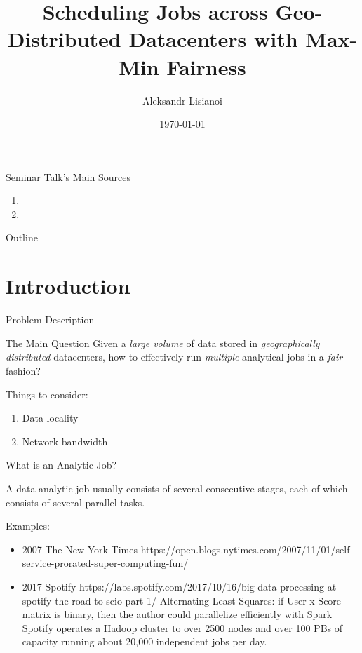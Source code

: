 \documentclass[presentation,professionalfonts]{beamer}
\institute[TU Wien]{Seminar ``\semname''\\\semester}
\date{\today}
\title[Scheduling Jobs with Max-Min Fairness]{Scheduling Jobs across Geo-Distributed Datacenters with Max-Min Fairness}
\author[Aleksandr Lisianoi]{Aleksandr Lisianoi}
\begin{document}
\maketitle


\begin{frame}{Seminar Talk's Main Sources}
  \begin{enumerate}
  \item {}
  \item {}
  \end{enumerate}
\end{frame}

\begin{frame}{Outline}
  \tableofcontents
\end{frame}

\section{Introduction}

\begin{frame}{Problem Description}
  \begin{block}{The Main Question}
    Given a \emph{large volume} of data stored in \emph{geographically distributed} datacenters, how to effectively run \emph{multiple} analytical jobs in a \emph{fair} fashion?
    \end{block}

  Things to consider:

  \begin{enumerate}
    \item Data locality
    \item Network bandwidth
  \end{enumerate}
\end{frame}

\begin{frame}{What is an Analytic Job?}

  A data analytic job usually consists of several consecutive stages, each of which consists of several parallel tasks.

  Examples:
  \begin{itemize}
  \item 2007 The New York Times https://open.blogs.nytimes.com/2007/11/01/self-service-prorated-super-computing-fun/
  \item 2017 Spotify https://labs.spotify.com/2017/10/16/big-data-processing-at-spotify-the-road-to-scio-part-1/
    Alternating Least Squares: if User x Score matrix is binary, then the author could parallelize efficiently with Spark
    Spotify operates a Hadoop cluster to over 2500 nodes and over 100 PBs of capacity running about 20,000 independent jobs per day.
    \end{itemize}

\end{frame}
\end{document}
